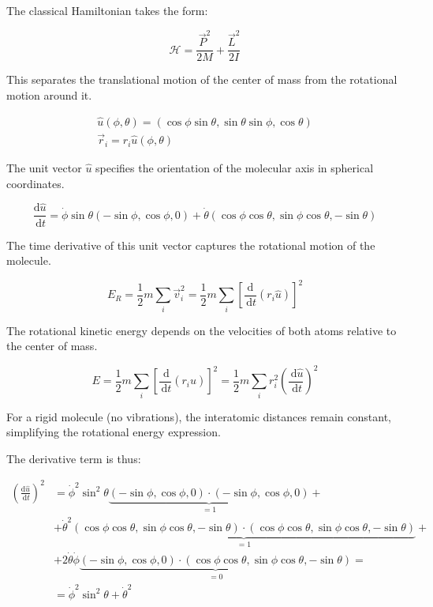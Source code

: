 \documentclass[italian]{HKNdocument}
\begin{document}
The classical Hamiltonian takes the form:

\begin{equation}
\mathcal{H}=\frac{\vec{P}^{2}}{2 M}+\frac{\vec{L}^{2}}{2 I} \label{eq:8.63}
\end{equation}

This separates the translational motion of the center of mass from the rotational motion around it.

\[
\begin{array}{r}
\hat{u}(\phi, \theta)=(\cos \phi \sin \theta, \sin \theta \sin \phi, \cos \theta)  \label{eq:8.64}\\
\vec{r}_{i}=r_{i} \hat{u}(\phi, \theta)
\end{array}
\]

The unit vector $\hat{u}$ specifies the orientation of the molecular axis in spherical coordinates.

\begin{equation}
\frac{\mathrm{d} \hat{u}}{\, \mathrm{d} t}=\dot{\phi} \sin \theta(-\sin \phi, \cos \phi, 0)+\dot{\theta}(\cos \phi \cos \theta, \sin \phi \cos \theta,-\sin \theta) \label{eq:8.65}
\end{equation}

The time derivative of this unit vector captures the rotational motion of the molecule.

\begin{equation}
E_{R}=\frac{1}{2} m \sum_{i} \vec{v}_{i}^{2}=\frac{1}{2} m \sum_{i}\left[\frac{\mathrm{d}}{\, \mathrm{d} t}\left(r_{i} \hat{u}\right)\right]^{2} \label{eq:8.66}
\end{equation}

The rotational kinetic energy depends on the velocities of both atoms relative to the center of mass.

\begin{equation}
E=\frac{1}{2} m \sum_{i}\left[\frac{\, \mathrm{d}}{\, \mathrm{d} t}\left(r_{i} \hat{u}\right)\right]^{2}=\frac{1}{2} m \sum_{i} r_{i}^{2}\left(\frac{\, \mathrm{d} \hat{u}}{\, \mathrm{d} t}\right)^{2} \label{eq:8.67}
\end{equation}

For a rigid molecule (no vibrations), the interatomic distances remain constant, simplifying the rotational energy expression.

The derivative term is thus:

\begin{align}
\left(\frac{\mathrm{d} \hat{u}}{\, \mathrm{d} t}\right)^{2} & =\dot{\phi}^{2} \sin ^{2} \theta \underbrace{(-\sin \phi, \cos \phi, 0) \cdot(-\sin \phi, \cos \phi, 0)}_{=1}+ \\
& +\dot{\theta}^{2} \underbrace{(\cos \phi \cos \theta, \sin \phi \cos \theta,-\sin \theta) \cdot(\cos \phi \cos \theta, \sin \phi \cos \theta,-\sin \theta)}_{=1}+ \\
& +2 \dot{\theta} \dot{\phi} \underbrace{(-\sin \phi, \cos \phi, 0) \cdot(\cos \phi \cos \theta, \sin \phi \cos \theta,-\sin \theta)}_{=0}= \\
& =\dot{\phi}^{2} \sin ^{2} \theta+\dot{\theta}^{2} \label{eq:8.68}
\end{align}
\end{document}
